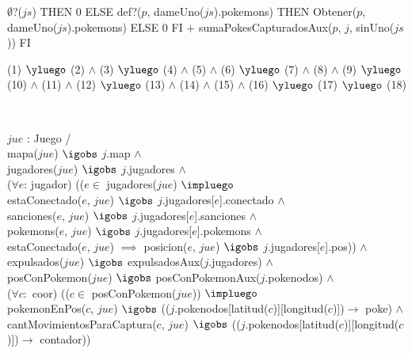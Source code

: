 \begin{Representacion}
%
$ $\newline

%
{\IF $\emptyset$?($js$) THEN 0 ELSE  
{\IF def?($p$, dameUno($js$).pokemons) THEN Obtener($p$, dameUno($js$).pokemons) ELSE 0 FI}  + sumaPokesCapturadosAux($p$, $j$, sinUno($js$))
FI} 
$ $\newline


%
{(1) $\yluego$ (2) $\land$ (3) $\yluego$ (4) $\land$ (5) $\land$ (6) $\yluego$ (7) $\land$ (8) $\land$ (9) $\yluego$\\
 (10) $\land$ (11) $\land$ (12) $\yluego$ (13) $\land$ (14) $\land$ (15) $\land$ (16) $\yluego$ (17) $\yluego$ (18)}

$ $\newline
$ $\newline



%
{
$jue$ : Juego / \\
  mapa($jue$) $\igobs$ $j$.map $\land$ \\
  jugadores($jue$) $\igobs$ $j$.jugadores $\land$ \\ 

  ($\forall e$: jugador) (($e \in$ jugadores($jue$) $\impluego$ \\
    estaConectado($e$, $jue$) $\igobs$ $j$.jugadores[$e$].conectado $\land$ \\
    sanciones($e$, $jue$) $\igobs$ $j$.jugadores[$e$].sanciones $\land$ \\
    pokemons($e$, $jue$) $\igobs$ $j$.jugadores[$e$].pokemons $\land$ \\
    estaConectado($e$, $jue$) $\implies$ posicion($e$, $jue$) $\igobs$ $j$.jugadores[$e$].pos)) $\land$ \\

  expulsados($jue$) $\igobs$ expulsadosAux($j$.jugadores) $\land$ \\
  posConPokemon($jue$) $\igobs$ posConPokemonAux($j$.pokenodos) $\land$ \\
  
  ($\forall c:$ coor) (($c \in$ posConPokemon($jue$)) $\impluego$ \\
    pokemonEnPos($c$, $jue$) $\igobs$ (($j$.pokenodos[latitud($c$)][longitud($c$)])$ \rightarrow$ poke) $\land$ \\
    cantMovimientosParaCaptura($c$, $jue$) $\igobs$ (($j$.pokenodos[latitud($c$)][longitud($c$)])$ \rightarrow$ contador))
}%

\end{Representacion}

